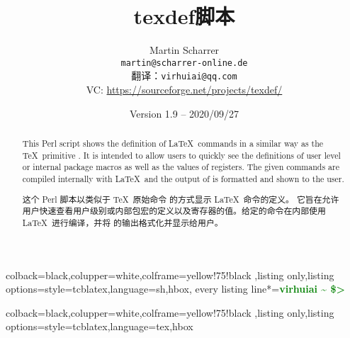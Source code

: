 \documentclass{article}
\begin{document}
\renewcommand*{\tcbdocnew}[1]{\textcolor{green!50!black}{\sffamily\bfseries N} #1}
\renewcommand*{\tcbdocupdated}[1]{\textcolor{blue!75!black}{\sffamily\bfseries U} #1}

%
{colback=black,colupper=white,colframe=yellow!75!black%
,listing only,listing options={style=tcblatex,language=sh},hbox,
every listing line*={\textcolor{green}{\small\ttfamily\bfseries virhuiai \textasciitilde{} \$> }}}


%
{colback=black,colupper=white,colframe=yellow!75!black%
,listing only,listing options={style=tcblatex,language=tex},hbox
}


\title{\textsf{texdef}脚本}
\author{Martin Scharrer \\
\texttt{martin@scharrer-online.de}\\
翻译：{\tt virhuiai@qq.com}\\
VC: \url{https://sourceforge.net/projects/texdef/}\\[-1em]
}
\date{Version 1.9 -- 2020/09/27}
\maketitle

\begin{abstract}
\noindent
This Perl script shows the definition of \LaTeX\ commands in a similar way as the \TeX\ primitive .
It is intended to allow users to quickly see the definitions of user level or internal package macros as well as the
values of registers. The given commands are compiled internally with \LaTeX\ and the output of  is formatted
and shown to the user.

\noindent
这个 Perl 脚本以类似于 \TeX\ 原始命令  的方式显示 \LaTeX\ 命令的定义。
它旨在允许用户快速查看用户级别或内部包宏的定义以及寄存器的值。给定的命令在内部使用 \LaTeX\ 进行编译，并将  的输出格式化并显示给用户。%
\end{abstract}
 
\end{document}

